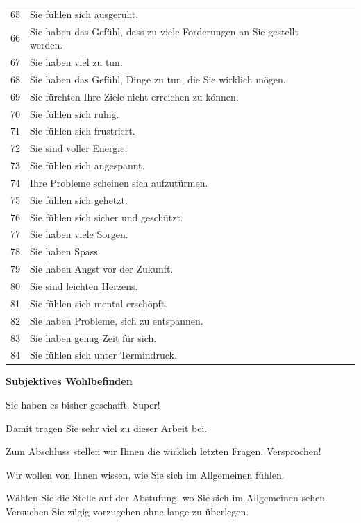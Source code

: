 \begin{flushleft}
\begin{longtable}[c]{ |p{1em}|p{14em}|p{4em}|p{4em}|p{4em}|p{4em}|}
  65 & Sie fühlen sich ausgeruht. & & & & \\
  66 & Sie haben das Gefühl, dass zu viele Forderungen an Sie gestellt werden. & & & & \\
  67 & Sie haben viel zu tun. & & & & \\
  68 & Sie haben das Gefühl, Dinge zu tun, die Sie wirklich mögen. & & & & \\
  69 & Sie fürchten Ihre Ziele nicht erreichen zu können. & & & & \\
  70 & Sie fühlen sich ruhig. & & & & \\
  71 & Sie fühlen sich frustriert. & & & & \\
  72 & Sie sind voller Energie. & & & & \\
  73 & Sie fühlen sich angespannt. & & & & \\
  74 & Ihre Probleme scheinen sich aufzutürmen. & & & & \\
  75 & Sie fühlen sich gehetzt. & & & & \\
  76 & Sie fühlen sich sicher und geschützt. & & & & \\
  77 & Sie haben viele Sorgen. & & & & \\
  78 & Sie haben Spass. & & & & \\
  79 & Sie haben Angst vor der Zukunft. & & & & \\
  80 & Sie sind leichten Herzens. & & & & \\
  81 & Sie fühlen sich mental erschöpft. & & & & \\
  82 & Sie haben Probleme, sich zu entspannen. & & & & \\
  83 & Sie haben genug Zeit für sich. & & & & \\
  84 & Sie fühlen sich unter Termindruck. & & & & \\
\end{longtable}

\textbf{Subjektives Wohlbefinden}

Sie haben es bisher geschafft. Super!

Damit tragen Sie sehr viel zu dieser Arbeit bei.

\vspace{2mm}
Zum Abschluss stellen wir Ihnen die wirklich letzten Fragen. Versprochen!

\vspace{2mm}
Wir wollen von Ihnen wissen, wie Sie sich im Allgemeinen fühlen.

Wählen Sie die Stelle auf der Abstufung, wo Sie sich im Allgemeinen sehen. Versuchen Sie zügig vorzugehen ohne lange zu überlegen.


\end{flushleft}
